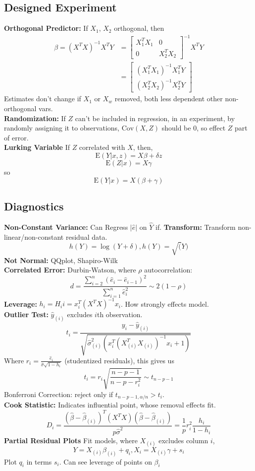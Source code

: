 \documentclass[10pt]{article}
\newcommand{\E}{\mathrm{E}}
\newcommand{\cov}{\mathrm{Cov}}
\theoremstyle{definition}
\begin{document}
\begin{multicols}{2}
\subsection{Designed Experiment}
{\bf Orthogonal Predictor:} If $X_1$, $X_2$ orthogonal, then
\begin{align*}
    \beta=(X^TX)^{-1}X^TY &= \left[\begin{array}{cc} X_1^TX_1 & 0 \\ 0 & X_2^TX_2 \end{array} \right]^{-1}X^TY  \\
                          &= \left[\begin{array}{c} (X_1^TX_1)^{-1}X_1^TY \\ (X_2^TX_2)^{-1}X_2^TY \end{array} \right] 
\end{align*}
Estimates don't change if $X_1$ or $X_w$ removed, both less dependent other non-orthogonal vars. \\
{\bf Randomization:} If $Z$ can't be included in regression, in an experiment, by randomly assigning it to observations, $\cov(X,Z)$ should be $0$, so effect $Z$ part of error. \\
{\bf Lurking Variable} If $Z$ correlated with $X$, then, 
\[\E(Y\vert x, z) = X\beta + \delta z\]
\[\E(Z\vert x) = X\gamma\]
so
\[\E(Y\vert x) = X(\beta+\gamma) \]

\subsection{Diagnostics}
{\bf Non-Constant Variance:} Can Regress $\vert \hat e \vert$ on $\hat Y$ if.
{\bf Transform:} Transform non-linear/non-constant residual data.
\[h(Y)=\log(Y+\delta), h(Y) = \sqrt(Y)\]
{\bf Not Normal:} QQplot, Shapiro-Wilk \\
{\bf Correlated Error:} Durbin-Watson, where $\rho$ autocorrelation:
\[d = \frac{\sum_{i=2}^{n} (\hat e_i - \hat e_{i-1})^2}{\sum_{i=1}^{n} \hat e_i^2} \sim 2(1-\rho) \]
{\bf Leverage:} \(h_i=H_ii=x_i^T(X^TX)^{-1}x_i\). How strongly effects model. \\
{\bf Outlier Test:} $\hat y_{(i)}$ excludes $i$th observation. 
\[t_i = \frac{y_i-\hat y_{(i)}}{\sqrt{\hat\sigma_{(i)}^2(x_i^T(X_{(i)}^TX_{(i)})^{-1}x_i + 1)}}\]
Where \(r_i = \frac{\hat e_i}{\hat \sigma\sqrt{1-h_i}} \) (studentized residuals), this gives us
\[t_i = r_i\sqrt{\frac{n-p-1}{n-p-r_i^2}} \sim t_{n-p-1}\]
Bonferroni Correction: reject only if  \(t_{n-p-1,\alpha/n}>t_i\). \\
{\bf Cook Statistic:} Indicates influential point, whose removal effects fit.
\[D_i = \frac{(\hat\beta - \hat\beta_{(i)})^T (X^TX)(\hat\beta - \hat\beta_{(i)})}{p\hat\sigma^2} = \frac{1}{p}r_i^2\frac{h_i}{1-h_i} \]
{\bf Partial Residual Plots} Fit models, where $X_{(i)}$ excludes column $i$,
\[Y=X_{(i)}\beta_{(i)}+q_i, X_i=X_{(i)}\gamma+s_i \]
Plot $q_i$ in terms $s_i$. Can see leverage of points on $\beta_i$


\end{multicols}
\end{document}
